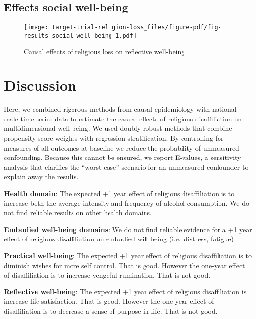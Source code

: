 \documentclass[
  singlecolumn]{report}
\begin{document}
\hypertarget{effects-social-well-being}{%
\subsection{Effects social well-being}\label{effects-social-well-being}}

\begin{figure}

{\centering \texttt{[image: target-trial-religion-loss\_files/figure-pdf/fig-results-social-well-being-1.pdf]}

}

\caption{\label{fig-results-social-well-being}Causal effects of
religious loss on reflective well-being}

\end{figure}

\hypertarget{discussion}{%
\section{Discussion}\label{discussion}}

Here, we combined rigorous methods from causal epidemiology with
national scale time-series data to estimate the causal effects of
religious disaffiliation on multidimensional well-being. We used doubly
robust methods that combine propensity score weights with regression
stratification. By controlling for measures of all outcomes at baseline
we reduce the probability of unmeasured confounding. Because this cannot
be ensured, we report E-values, a sensitivity analysis that clarifies
the ``worst case'' scenario for an unmeasured confounder to explain away
the results.

\textbf{Health domain}: The expected +1 year effect of religious
disaffiliation is to increase both the average intensity and frequency
of alcohol consumption. We do not find reliable results on other health
domains.

\textbf{Embodied well-being domains}: We do not find reliable evidence
for a +1 year effect of religious disaffiliation on embodied will being
(i.e.~distress, fatigue)

\textbf{Practical well-being}: The expected +1 year effect of religious
disaffiliation is to diminish wishes for more self control. That is
good. However the one-year effect of disaffiliation is to increase
vengeful rumination. That is not good.

\textbf{Reflective well-being}: The expected +1 year effect of religious
disaffiliation is increase life satisfaction. That is good. However the
one-year effect of disaffiliation is to decrease a sense of purpose in
life. That is not good.
\end{document}
